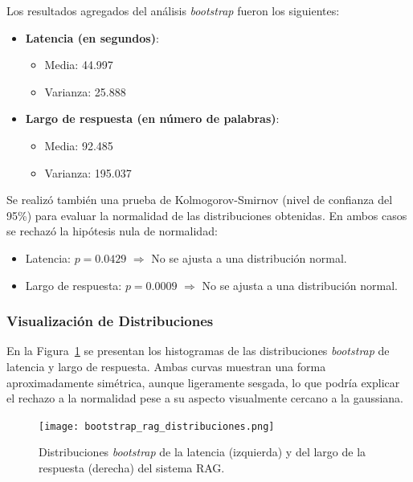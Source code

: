 \documentclass[runningheads]{llncs}
\begin{document}
Los resultados agregados del análisis \textit{bootstrap} fueron los siguientes:

\begin{itemize}
    \item \textbf{Latencia (en segundos)}:
    \begin{itemize}
        \item Media: 44.997
        \item Varianza: 25.888
    \end{itemize}
    
    \item \textbf{Largo de respuesta (en número de palabras)}:
    \begin{itemize}
        \item Media: 92.485
        \item Varianza: 195.037
    \end{itemize}
\end{itemize}

Se realizó también una prueba de Kolmogorov-Smirnov (nivel de confianza del 95\%) para evaluar la normalidad de las distribuciones obtenidas. En ambos casos se rechazó la hipótesis nula de normalidad:
\begin{itemize}
    \item Latencia: $p = 0.0429$ $\Rightarrow$ No se ajusta a una distribución normal.
    \item Largo de respuesta: $p = 0.0009$ $\Rightarrow$ No se ajusta a una distribución normal.
\end{itemize}

\subsubsection{Visualización de Distribuciones}

En la Figura~\ref{fig:bootstrap_distribuciones} se presentan los histogramas de las distribuciones \textit{bootstrap} de latencia y largo de respuesta. Ambas curvas muestran una forma aproximadamente simétrica, aunque ligeramente sesgada, lo que podría explicar el rechazo a la normalidad pese a su aspecto visualmente cercano a la gaussiana.

\begin{figure}[H]
    \centering
    \texttt{[image: bootstrap\_rag\_distribuciones.png]}
    \caption{Distribuciones \textit{bootstrap} de la latencia (izquierda) y del largo de la respuesta (derecha) del sistema RAG.}
    \label{fig:bootstrap_distribuciones}
\end{figure}
\end{document}
